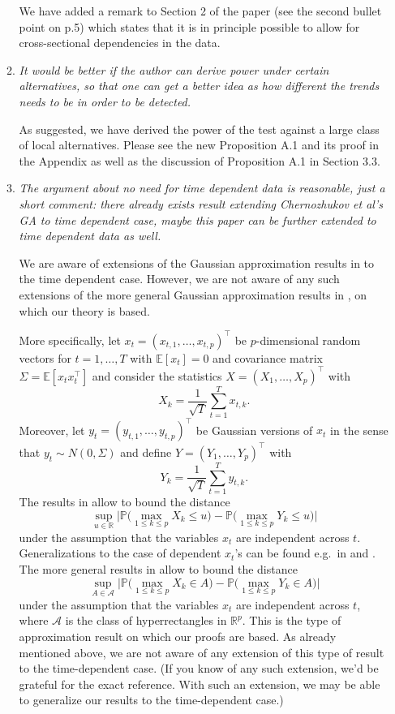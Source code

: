\documentclass[a4paper,12pt]{article}
\begin{document}
\begin{enumerate}[label=(\arabic*),leftmargin=0.7cm]
\begin{enumerate}[label=(\alph*),leftmargin=0.7cm]
We have added a remark to Section 2 of the paper (see the second bullet point on p.5) which states that it is in principle possible to allow for cross-sectional dependencies in the data.


\item \textit{It would be better if the author can derive power under certain alternatives, so that one can get a better idea as how different the trends needs to be in order to be detected.}

As suggested, we have derived the power of the test against a large class of local alternatives. Please see the new Proposition A.1 and its proof in the Appendix as well as the discussion of Proposition A.1 in Section 3.3.


\item \textit{The argument about no need for time dependent data is reasonable, just a short comment: there already exists result extending Chernozhukov et al's GA to time dependent case, maybe this paper can be further extended to time dependent data as well.}

We are aware of extensions of the Gaussian approximation results in \cite{Chernozhukov2013} to the time dependent case. However, we are not aware of any such extensions of the more general Gaussian approximation results in \cite{Chernozhukov2017}, on which our theory is based. 

More specifically, let $x_t = (x_{t,1},\ldots,x_{t,p})^\top$ be $p$-dimensional random vectors for $t=1,\ldots,T$ with $\mathbb{E}[x_t] = 0$ and covariance matrix $\Sigma = \mathbb{E}[x_t x_t^\top]$ and consider the statistics $X = (X_1,\ldots,X_p)^\top$ with
\[ X_k = \frac{1}{\sqrt{T}} \sum_{t=1}^T x_{t,k}. \]
Moreover, let $y_t = (y_{t,1},\ldots,y_{t,p})^\top$ be Gaussian versions of $x_t$ in the sense that $y_t \sim N(0,\Sigma)$ and define $Y = (Y_1,\ldots,Y_p)^\top$ with
\[ Y_k = \frac{1}{\sqrt{T}} \sum_{t=1}^T y_{t,k}. \]
The results in \cite{Chernozhukov2013} allow to bound the distance
\[ \sup_{u \in \mathbb{R}} \Big| \mathbb{P} \Big( \max_{1 \le k \le p} X_k \le u \Big) - \mathbb{P} \Big( \max_{1 \le k \le p} Y_k \le u \Big) \Big| \]
under the assumption that the variables $x_t$ are independent across $t$. Generalizations to the case of dependent $x_t$'s can be found e.g.\ in \cite{ZhangWu2017} and \cite{ZhangCheng2018}. The more general results in \cite{Chernozhukov2017} allow to bound the distance 
\[ \sup_{A \in \mathcal{A}} \Big| \mathbb{P} \Big( \max_{1 \le k \le p} X_k \in A \Big) - \mathbb{P} \Big( \max_{1 \le k \le p} Y_k \in A \Big) \Big| \]
under the assumption that the variables $x_t$ are independent across $t$, where $\mathcal{A}$ is the class of hyperrectangles in $\mathbb{R}^p$. This is the type of approximation result on which our proofs are based. As already mentioned above, we are not aware of any extension of this type of result to the time-dependent case. (If you know of any such extension, we'd be grateful for the exact reference. With such an extension, we may be able to generalize our results to the time-dependent case.) 
\end{enumerate}



\end{enumerate}
\end{document}
